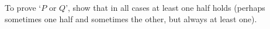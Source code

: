 To prove `\( P \) or \( Q \)', show that in all cases at least one
half holds (perhaps sometimes one half and sometimes the other,
but always at least one).



%
%
%
%
%
